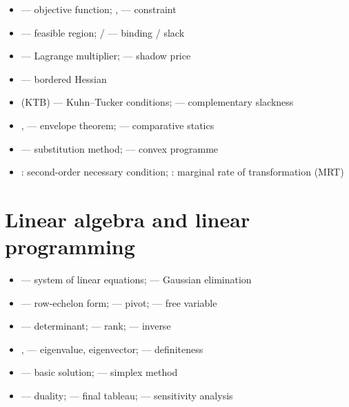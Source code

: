 \begin{itemize}[leftmargin=1.4em,itemsep=0.15ex]
  \item {} --- objective function;
        ,  --- constraint
  \item {} --- feasible region;
         /  --- binding / slack
  \item {} --- Lagrange multiplier;
         --- shadow price
  \item {} --- bordered Hessian
  \item {} (KTB) --- Kuhn--Tucker conditions;
         --- complementary slackness
  \item {},  --- envelope theorem;
         --- comparative statics
  \item {} --- substitution method;
         --- convex programme
  \item {}: second-order
        necessary condition; : marginal
        rate of transformation (MRT)
\end{itemize}

\section*{Linear algebra and linear programming}

\begin{itemize}[leftmargin=1.4em,itemsep=0.15ex]
  \item {} --- system of linear equations;
         --- Gaussian elimination
  \item {} --- row-echelon form;
         --- pivot;  --- free variable
  \item {} --- determinant;  --- rank;
         --- inverse
  \item {},  --- eigenvalue, eigenvector;
         --- definiteness
  \item {} --- basic solution;
         --- simplex method
  \item {} --- duality;  --- final tableau;
         --- sensitivity analysis
\end{itemize}

